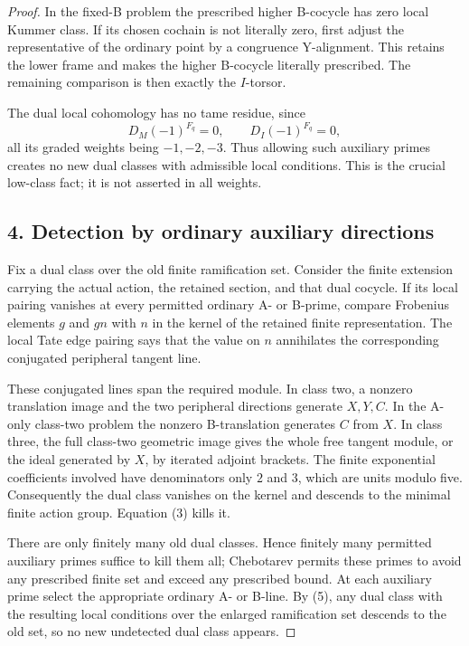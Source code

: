 \begin{proof}
In the fixed-B problem the prescribed higher B-cocycle has zero local Kummer class. If its chosen cochain is not literally zero, first adjust the representative of the ordinary point by a congruence Y-alignment. This retains the lower frame and makes the higher B-cocycle literally prescribed. The remaining comparison is then exactly the $I$-torsor.

The dual local cohomology has no tame residue, since
\[
 D_M(-1)^{F_q}=0,\qquad D_I(-1)^{F_q}=0,
 \tag{5}
\]
all its graded weights being $-1,-2,-3$. Thus allowing such auxiliary primes creates no new dual classes with admissible local conditions. This is the crucial low-class fact; it is not asserted in all weights.

\subsection*{4. Detection by ordinary auxiliary directions}
Fix a dual class over the old finite ramification set. Consider the finite extension carrying the actual action, the retained section, and that dual cocycle. If its local pairing vanishes at every permitted ordinary A- or B-prime, compare Frobenius elements $g$ and $gn$ with $n$ in the kernel of the retained finite representation. The local Tate edge pairing says that the value on $n$ annihilates the corresponding conjugated peripheral tangent line.

These conjugated lines span the required module. In class two, a nonzero translation image and the two peripheral directions generate $X,Y,C$. In the A-only class-two problem the nonzero B-translation generates $C$ from $X$. In class three, the full class-two geometric image gives the whole free tangent module, or the ideal generated by $X$, by iterated adjoint brackets. The finite exponential coefficients involved have denominators only $2$ and $3$, which are units modulo five. Consequently the dual class vanishes on the kernel and descends to the minimal finite action group. Equation (3) kills it.

There are only finitely many old dual classes. Hence finitely many permitted auxiliary primes suffice to kill them all; Chebotarev permits these primes to avoid any prescribed finite set and exceed any prescribed bound. At each auxiliary prime select the appropriate ordinary A- or B-line. By (5), any dual class with the resulting local conditions over the enlarged ramification set descends to the old set, so no new undetected dual class appears.


\end{proof}
